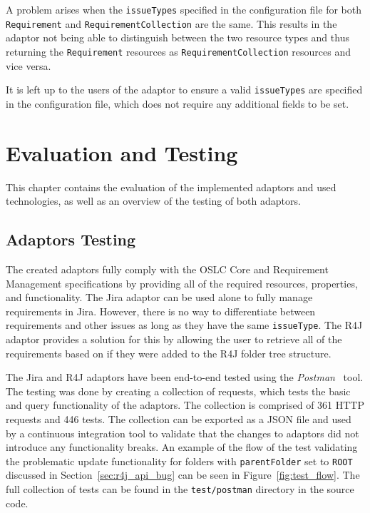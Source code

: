 A problem arises when the \texttt{issueTypes} specified in the configuration file for both \texttt{Requirement} and \texttt{RequirementCollection} are the same. This results in the adaptor not being able to distinguish between the two resource types and thus returning the \texttt{Requirement} resources as \texttt{RequirementCollection} resources and vice versa.

It is left up to the users of the adaptor to ensure a valid \texttt{issueTypes} are specified in the configuration file, which does not require any additional fields to be set.


\chapter{Evaluation and Testing}
\label{chapter:evaluation}
This chapter contains the evaluation of the implemented adaptors and used technologies, as well as an overview of the testing of both adaptors.

\section{Adaptors Testing}
The created adaptors fully comply with the OSLC Core and Requirement Management specifications by providing all of the required resources, properties, and functionality. The Jira adaptor can be used alone to fully manage requirements in Jira. However, there is no way to differentiate between requirements and other issues as long as they have the same \texttt{issueType}. The R4J adaptor provides a solution for this by allowing the user to retrieve all of the requirements based on if they were added to the R4J folder tree structure.

The Jira and R4J adaptors have been end-to-end tested using the \emph{Postman} \cite{postman} tool. The testing was done by creating a collection of requests, which tests the basic and query functionality of the adaptors. The collection is comprised of 361 HTTP requests and 446 tests. The collection can be exported as a JSON file and used by a continuous integration tool to validate that the changes to adaptors did not introduce any functionality breaks. An example of the flow of the test validating the problematic update functionality for folders with \texttt{parentFolder} set to \texttt{ROOT} discussed in Section \ref{sec:r4j_api_bug} can be seen in Figure \ref{fig:test_flow}. The full collection of tests can be found in the \texttt{test/postman} directory in the source code.

